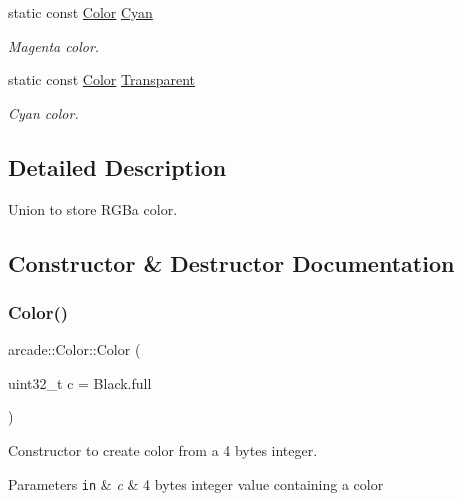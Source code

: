 \begin{DoxyCompactItemize}
static const \hyperlink{unionarcade_1_1_color}{Color} \hyperlink{unionarcade_1_1_color_a73cbdbe2ebf731489bafec16cb88e705}{Cyan}
\begin{DoxyCompactList}\small\item\em Magenta color. \end{DoxyCompactList}\item 
static const \hyperlink{unionarcade_1_1_color}{Color} \hyperlink{unionarcade_1_1_color_a689350442a28301beb49ca78a4885e4f}{Transparent}
\begin{DoxyCompactList}\small\item\em Cyan color. \end{DoxyCompactList}\end{DoxyCompactItemize}


\subsection{Detailed Description}
Union to store R\+G\+Ba color. 

\subsection{Constructor \& Destructor Documentation}
\mbox{\label{unionarcade_1_1_color_a053784aa4df3917111e2717d74fa3d85}} 
\subsubsection{\texorpdfstring{Color()}{Color()}\hspace{0.1cm}{\footnotesize\ttfamily [1/3]}}
{\footnotesize\ttfamily arcade\+::\+Color\+::\+Color (\begin{DoxyParamCaption}\item[{uint32\+\_\+t}]{c = {\ttfamily Black.full} }\end{DoxyParamCaption})}



Constructor to create color from a 4 bytes integer. 


\begin{DoxyParams}[1]{Parameters}
\mbox{\tt in}  & {\em c} & 4 bytes integer value containing a color \\
\hline
\end{DoxyParams}
\mbox{\label{unionarcade_1_1_color_acf519d304c0dae64e28b976414af0753}} 
